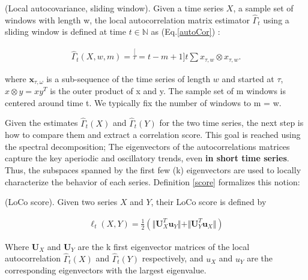 \begin{definition}
(Local autocovariance, sliding window). Given a time series $X$, a sample set of windows with length w, the local autocorrelation matrix estimator $\hat{\Gamma}_{t}$ using a sliding window is defined at time $t \in \mathbb{N} $ as (Eq.\ref{autoCor}) : 

\begin{eqnarray}
\hat{\varGamma}_{t}(X,w,m)=\stackrel[\tau=t-m+1]{t}{\sum}x_{\tau,w}\otimes x_{\tau,w}.
\label{autoCor}
\end{eqnarray}

where $\boldsymbol{x}_{\tau,\omega}$ is a sub-sequence of the time series of length $w$ and started at $\tau$, $x \otimes y = xy^T$ is the outer product of x and y. The sample set of m windows is centered around time t.
We typically fix the number of windows to m = w.
\end{definition}

Given the estimates $\hat{\Gamma}_{t}(X)$ and $\hat{\Gamma}_{t}(Y)$ for the two time series, the next step is how to compare them and extract a correlation score. This goal is reached using the spectral decomposition; The eigenvectors of the autocorrelations matrices capture the key aperiodic and oscillatory trends, even \textbf{in short time series}.  Thus, the subspaces spanned by the first few (k) eigenvectors are used  to locally characterize the behavior of each series. Definition \ref{score} formalizes this notion: 


\begin{definition}
\label{score}
(LoCo score). Given two series $X$ and $Y$, their LoCo score is defined by

\begin{eqnarray}
\ell_{t}(X,Y)=\frac{1}{2}(\Vert
\boldsymbol{U}_{X}^{T}\boldsymbol{u}_{Y}\Vert+\Vert
\boldsymbol{U}_{Y}^{T}\boldsymbol{u}_{X}\Vert)
\end{eqnarray}

\end{definition}    
   

Where $\boldsymbol{U}_X$ and  $\boldsymbol{U}_Y$ are the k first eigenvector
matrices of the local autocorrelation $\hat{\Gamma}_{t}(X)$ and
$\hat{\Gamma}_{t}(Y)$ respectively, and $u_X$  and $u_Y$  are the
corresponding eigenvectors with the largest eigenvalue. 

